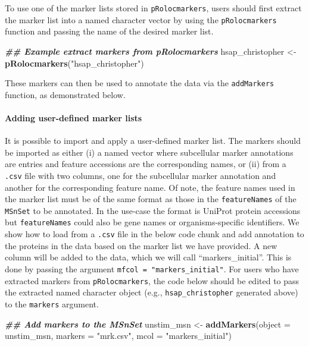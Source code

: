 \documentclass[9pt,a4paper,]{extarticle}
\newenvironment{Shaded}{\begin{snugshade}}{\end{snugshade}}
\newcommand{\AttributeTok}[1]{\textcolor[rgb]{0.13,0.29,0.53}{#1}}
\newcommand{\DocumentationTok}[1]{\textcolor[rgb]{0.56,0.35,0.01}{\textbf{\textit{#1}}}}
\newcommand{\FunctionTok}[1]{\textcolor[rgb]{0.13,0.29,0.53}{\textbf{#1}}}
\newcommand{\NormalTok}[1]{#1}
\newcommand{\OtherTok}[1]{\textcolor[rgb]{0.56,0.35,0.01}{#1}}
\newcommand{\StringTok}[1]{\textcolor[rgb]{0.31,0.60,0.02}{#1}}
\begin{document}
To use one of the marker lists stored in \texttt{pRolocmarkers}, users should first
extract the marker list into a named character vector by using the \texttt{pRolocmarkers}
function and passing the name of the desired marker list.

\begin{Shaded}
\begin{Highlighting}[]
\DocumentationTok{\#\# Example extract markers from pRolocmarkers}
\NormalTok{hsap\_christopher }\OtherTok{\textless{}{-}} \FunctionTok{pRolocmarkers}\NormalTok{(}\StringTok{"hsap\_christopher"}\NormalTok{)}
\end{Highlighting}
\end{Shaded}

These markers can then be used to annotate the data via the \texttt{addMarkers} function,
as demonstrated below.

\paragraph{Adding user-defined marker lists}\label{adding-user-defined-marker-lists}

It is possible to import and apply a user-defined marker list. The markers
should be imported as either (i) a named vector where subcellular marker
annotations are entries and feature accessions are the corresponding names, or
(ii) from a \texttt{.csv} file with two columns, one for the subcellular marker annotation
and another for the corresponding feature name. Of note, the feature names used
in the marker list must be of the same format as those in the \texttt{featureNames} of
the \texttt{MSnSet} to be annotated. In the use-case the format is UniProt protein accessions
but \texttt{featureNames} could also be gene names or organisms-specific identifiers.
We show how to load from a \texttt{.csv} file in the below code chunk and add annotation
to the proteins in the data based on the marker list we have provided. A new
column will be added to the data, which we will call ``markers\_initial''. This is
done by passing the argument \texttt{mfcol\ =\ "markers\_initial"}. For users who have
extracted markers from \texttt{pRolocmarkers}, the code below should be edited to pass
the extracted named character object (e.g., \texttt{hsap\_christopher} generated above)
to the \texttt{markers} argument.

\begin{Shaded}
\begin{Highlighting}[]
\DocumentationTok{\#\# Add markers to the MSnSet}
\NormalTok{unstim\_msn }\OtherTok{\textless{}{-}} \FunctionTok{addMarkers}\NormalTok{(}\AttributeTok{object =}\NormalTok{ unstim\_msn,}
                         \AttributeTok{markers =} \StringTok{"mrk.csv"}\NormalTok{,}
                         \AttributeTok{mcol =} \StringTok{"markers\_initial"}\NormalTok{)}
\end{Highlighting}
\end{Shaded}
\end{document}
